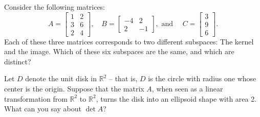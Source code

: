\documentclass[addpoints]{exam}
\newcommand{\R}{\mathbb{R}}
\begin{document}
\begin{questions}

\question[10] Consider the following matrices:
\[A = \begin{bmatrix} 1 & 2 \\ 3 & 6 \\ 2 & 4 \end{bmatrix}, \quad
B = \begin{bmatrix} -4 & 2 \\ 2 & -1 \end{bmatrix},\text{ and }\quad
C = \begin{bmatrix} 3 \\ 9 \\ 6 \end{bmatrix}.\]
Each of these three matrices corresponds to two different subspaces: The kernel and the image. Which of these six subspaces are the same, and which are distinct?


\question[5] Let $D$ denote the unit disk in $\R^2$ -- that is, $D$ is the circle with radius one whose center is the origin. Suppose that the matrix $A$, when seen as a linear transformation from $\R^2$ to $\R^2$, turns the disk into an ellipsoid shape with area 2. What can you say about $\det A$?


\end{questions}
\end{document}

